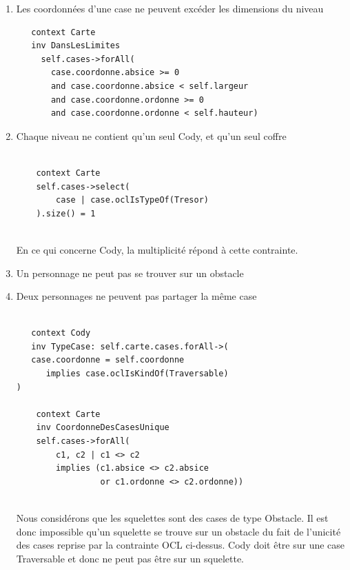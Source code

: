 \documentclass[11pt]{article}
\begin{document}
\begin{enumerate}
 
 \item Les coordonnées d'une case ne peuvent excéder les dimensions du niveau
 
 \begin{verbatim}
   context Carte
   inv DansLesLimites
     self.cases->forAll(
       case.coordonne.absice >= 0
       and case.coordonne.absice < self.largeur
       and case.coordonne.ordonne >= 0
       and case.coordonne.ordonne < self.hauteur)
 \end{verbatim}
  
  \item Chaque niveau ne contient qu'un seul Cody, et qu'un seul coffre  
  
  \begin{verbatim}
    
    context Carte
    self.cases->select(
        case | case.oclIsTypeOf(Tresor)
    ).size() = 1    
    
  \end{verbatim}    
  
  En ce qui concerne Cody, la multiplicité répond à cette contrainte.\\
  
  
  \item Un personnage ne peut pas se trouver sur un obstacle 
  
  \item Deux personnages ne peuvent pas partager la même case
  
  \begin{verbatim}
    
   context Cody
   inv TypeCase: self.carte.cases.forAll->(
   case.coordonne = self.coordonne 
      implies case.oclIsKindOf(Traversable)
)    
    
    context Carte
    inv CoordonneDesCasesUnique
    self.cases->forAll(
        c1, c2 | c1 <> c2 
        implies (c1.absice <> c2.absice 
                 or c1.ordonne <> c2.ordonne))    
    
  \end{verbatim}     
  
  Nous considérons que les squelettes sont des cases de type Obstacle. Il est donc impossible qu'un squelette se trouve sur un obstacle du fait de l'unicité des cases reprise par la contrainte OCL ci-dessus. Cody doit être sur une case Traversable et donc ne peut pas être sur un squelette.\\
  

\end{enumerate}
\end{document}
